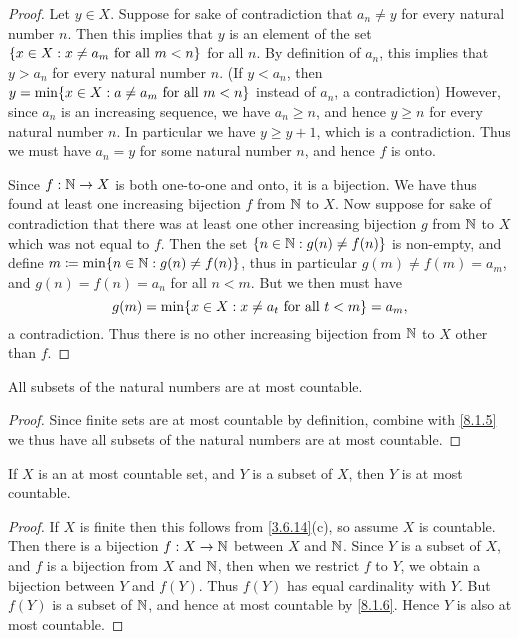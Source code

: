 \begin{proof}
	Let \(y \in X\).
	Suppose for sake of contradiction that \(a_n \neq y\) for every natural number \(n\).
	Then this implies that \(y\) is an element of the set \(\left\lbrace x \in X : x \neq a_m \text{ for all } m < n\right\rbrace\) for all \(n\).
	By definition of \(a_n\), this implies that \(y > a_n\) for every natural number \(n\).
	(If \(y < a_n\), then \(y = \min\set{x \in X : a \neq a_m \text{ for all } m < n}\) instead of \(a_n\), a contradiction)
	However, since \(a_n\) is an increasing sequence, we have \(a_n \geq n\), and hence \(y \geq n\) for every natural number \(n\).
	In particular we have \(y \geq y + 1\), which is a contradiction.
	Thus we must have \(a_n = y\) for some natural number \(n\), and hence \(f\) is onto.

	Since \(f : \mathbb{N} \to X\) is both one-to-one and onto, it is a bijection.
	We have thus found at least one increasing bijection \(f\) from \(\mathbb{N}\) to \(X\).
	Now suppose for sake of contradiction that there was at least one other increasing bijection \(g\) from \(\mathbb{N}\) to \(X\) which was not equal to \(f\).
	Then the set \(\left\lbrace n \in \mathbb{N} : g(n) \neq f(n)\right\rbrace\) is non-empty, and define \(m \coloneqq \min\set{n \in \N : g(n) \neq f(n)}\), thus in particular \(g(m) \neq f(m) = a_m\), and \(g(n) = f(n) = a_n\) for all \(n < m\).
	But we then must have
	\[
		g(m) = \min\set{x \in X : x \neq a_t \text{ for all } t < m} = a_m,
	\]
	a contradiction.
	Thus there is no other increasing bijection from \(\mathbb{N}\) to \(X\) other than \(f\).
\end{proof}

\begin{cor}\label{8.1.6}
	All subsets of the natural numbers are at most countable.
\end{cor}

\begin{proof}
	Since finite sets are at most countable by definition, combine with \cref{8.1.5} we thus have all subsets of the natural numbers are at most countable.
\end{proof}

\begin{cor}\label{8.1.7}
	If \(X\) is an at most countable set, and \(Y\) is a subset of \(X\), then \(Y\) is at most countable.
\end{cor}

\begin{proof}
	If \(X\) is finite then this follows from \cref{3.6.14}(c), so assume \(X\) is countable.
	Then there is a bijection \(f : X \to \mathbb{N}\) between \(X\) and \(\mathbb{N}\).
	Since \(Y\) is a subset of \(X\), and \(f\) is a bijection from \(X\) and \(\mathbb{N}\), then when we restrict \(f\) to \(Y\), we obtain a bijection between \(Y\) and \(f(Y)\).
	Thus \(f(Y)\) has equal cardinality with \(Y\).
	But \(f(Y)\) is a subset of \(\mathbb{N}\), and hence at most countable by \cref{8.1.6}.
	Hence \(Y\) is also at most countable.
\end{proof}

